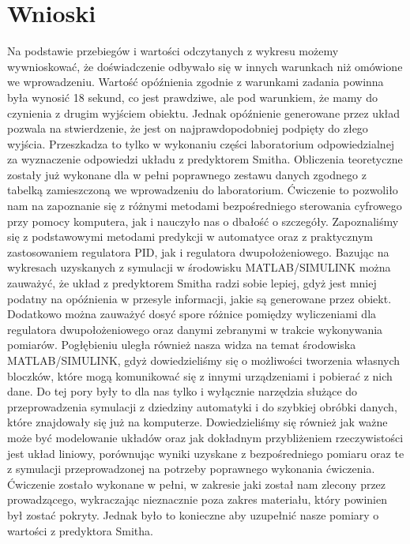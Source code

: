\documentclass[a4paper]{article}
\begin{document}
	\section{Wnioski}
		Na podstawie przebiegów i wartości odczytanych z wykresu możemy wywnioskować, że doświadczenie odbywało się w innych warunkach niż omówione we wprowadzeniu. Wartość opóźnienia zgodnie z warunkami zadania powinna była wynosić 18 sekund, co jest prawdziwe, ale pod warunkiem, że mamy do czynienia z drugim wyjściem obiektu. Jednak opóźnienie generowane przez układ pozwala na stwierdzenie, że jest on najprawdopodobniej podpięty do złego wyjścia. Przeszkadza to tylko w wykonaniu części laboratorium odpowiedzialnej za wyznaczenie odpowiedzi układu z predyktorem Smitha. Obliczenia teoretyczne zostały już wykonane dla w pełni poprawnego zestawu danych zgodnego z tabelką zamieszczoną we wprowadzeniu do laboratorium. Ćwiczenie to pozwoliło nam na zapoznanie się z różnymi metodami bezpośredniego sterowania cyfrowego przy pomocy komputera, jak i nauczyło nas o dbałość o szczegóły. Zapoznaliśmy się z podstawowymi metodami predykcji w automatyce oraz z praktycznym zastosowaniem regulatora PID, jak i regulatora dwupołożeniowego.
		\newline 
		\newline
		Bazując na wykresach uzyskanych z symulacji w środowisku MATLAB/SIMULINK można zauważyć, że układ z predyktorem Smitha radzi sobie lepiej, gdyż jest mniej podatny na opóźnienia w przesyle informacji, jakie są generowane przez obiekt. Dodatkowo można zauważyć dosyć spore różnice pomiędzy wyliczeniami dla regulatora dwupołożeniowego oraz danymi zebranymi w trakcie wykonywania pomiarów.
		\newline 
		\newline
		Pogłębieniu uległa również nasza widza na temat środowiska MATLAB/SIMULINK, gdyż dowiedzieliśmy się o możliwości tworzenia własnych bloczków, które mogą komunikować się z innymi urządzeniami i pobierać z nich dane. Do tej pory były to dla nas tylko i wyłącznie narzędzia służące do przeprowadzenia symulacji z dziedziny automatyki i do szybkiej obróbki danych, które znajdowały się już na komputerze.
		\newline
		\newline
		Dowiedzieliśmy się również jak ważne może być modelowanie układów oraz jak dokładnym przybliżeniem rzeczywistości jest układ liniowy, porównując wyniki uzyskane z bezpośredniego pomiaru oraz te z symulacji przeprowadzonej na potrzeby poprawnego wykonania ćwiczenia. 
		\newline
		\newline 
		Ćwiczenie zostało wykonane w pełni, w zakresie jaki został nam zlecony przez prowadzącego, wykraczając nieznacznie poza zakres materiału, który powinien był zostać pokryty. Jednak było to konieczne aby uzupełnić nasze pomiary o wartości z predyktora Smitha.
\end{document}

